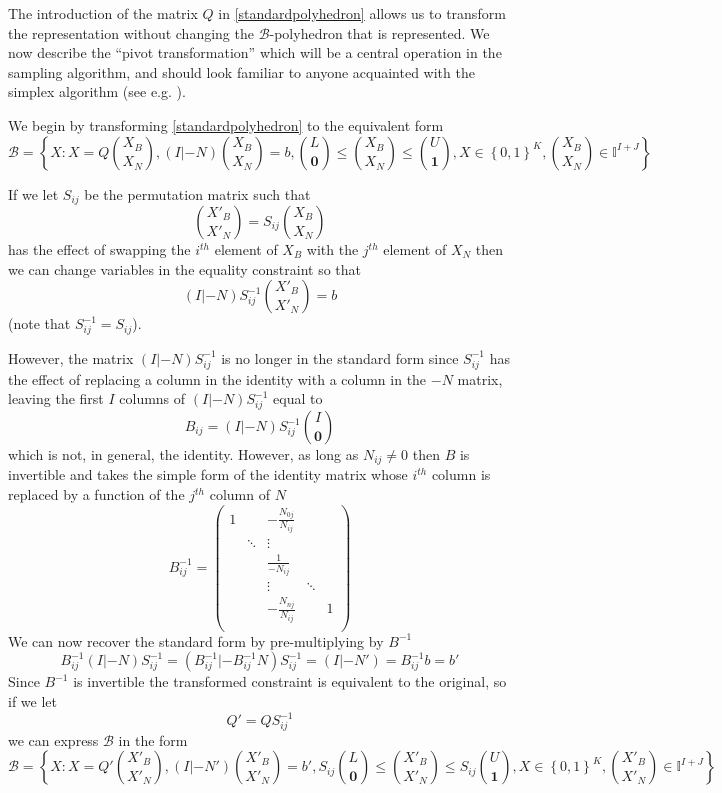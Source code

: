 \documentclass{article}
\begin{document}
The introduction of the matrix $Q$ in \eqref{standardpolyhedron} allows us to transform the representation without changing the $\mathcal{B}$-polyhedron that is represented. We now describe the ``pivot transformation'' which will be a central operation in the sampling algorithm, and should look familiar to anyone acquainted with the simplex algorithm (see e.g. \cite{vanderbei2015linear}).

We begin by transforming \eqref{standardpolyhedron} to the equivalent form
\begin{equation}
\mathcal{B} = \left\{X: X = Q{X_B\choose X_N}, (I|-N){X_B\choose X_N} = b, {L\choose \mathbf{0}} \le {X_B \choose X_N} \le {U\choose \mathbf{1}}, X \in \left\{ 0,1\right\}^K, {X_B\choose X_N} \in \mathbb{I}^{I+J} \right\}
\label{joinedpolyhedron}
\end{equation}

If we let $S_{ij}$ be the permutation matrix such that
\[
{X'_B\choose X'_N} = S_{ij}{X_B\choose X_N}
\]
has the effect of swapping the $i^{th}$ element of $X_B$ with the $j^{th}$ element of $X_N$ then we can change variables in the equality constraint so that
\[
(I|-N)S^{-1}_{ij}{X'_B \choose X'_N} = b
\]
(note that $S^{-1}_{ij} = S_{ij}$).

However, the matrix $(I|-N)S^{-1}_{ij}$ is no longer in the standard form since $S^{-1}_{ij}$ has the effect of replacing a column in the identity with a column in the $-N$ matrix, leaving the first $I$ columns of $(I|-N)S^{-1}_{ij}$ equal to
\[
B_{ij} = (I|-N)S^{-1}_{ij}{I \choose \mathbf{0}}
\]
which is not, in general, the identity. However, as long as $N_{ij} \ne 0$ then $B$ is invertible and takes the simple form of the identity matrix whose $i^{th}$ column is replaced by a function of the $j^{th}$ column of $N$
\[
B_{ij}^{-1} =  
\begin{pmatrix}
1 &  & -\frac{N_{0j}}{N_{ij}} & & \\
  & \ddots & \vdots & &\\
 & & \frac{1}{-N_{ij}} & &\\
  & & \vdots & \ddots &\\
  & & -\frac{N_{nj}}{N_{ij}} & &1\\
\end{pmatrix}
\]
We can now recover the standard form by pre-multiplying by $B^{-1}$
\begin{equation}
B_{ij}^{-1}(I|-N)S^{-1}_{ij} = (B_{ij}^{-1}|-B_{ij}^{-1}N)S^{-1}_{ij} = (I|-N') = B_{ij}^{-1}b  = b'
\label{Ntransform}
\end{equation}
Since $B^{-1}$ is invertible the transformed constraint is equivalent to the original, so if we let
\[
Q' = QS^{-1}_{ij}
\]
we can express $\mathcal{B}$ in the form
\begin{equation}
\mathcal{B} = \left\{X: X = Q'{X'_B\choose X'_N}, (I|-N'){X'_B\choose X'_N} = b', S_{ij}{L\choose \mathbf{0}} \le {X'_B \choose X'_N} \le S_{ij}{U\choose \mathbf{1}}, X \in \left\{ 0,1\right\}^K, {X'_B\choose X'_N} \in \mathbb{I}^{I+J} \right\}
\end{equation}
\end{document}
